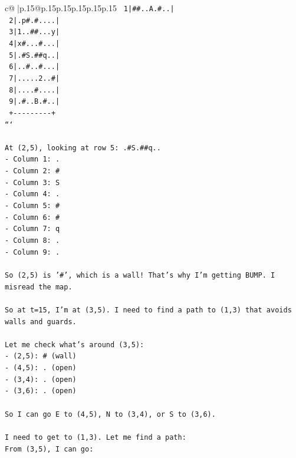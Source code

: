 \documentclass{article}
\begin{document}
{\begin{supertabular}{c@{$\;$}|p{.15\linewidth}@{}p{.15\linewidth}p{.15\linewidth}p{.15\linewidth}p{.15\linewidth}p{.15\linewidth}}
{{{\texttt{ 1|\#\#..A.\#..|} \\
\texttt{ 2|.p\#.\#....|} \\
\texttt{ 3|1..\#\#...y|} \\
\texttt{ 4|x\#...\#...|} \\
\texttt{ 5|.\#S.\#\#q..|} \\
\texttt{ 6|..\#..\#...|} \\
\texttt{ 7|.....2..\#|} \\
\texttt{ 8|....\#....|} \\
\texttt{ 9|.\#..B.\#..|} \\
\texttt{  +{-}{-}{-}{-}{-}{-}{-}{-}{-}+} \\
\texttt{```} \\
\\ 
\texttt{At (2,5), looking at row 5: .\#S.\#\#q..} \\
\texttt{{-} Column 1: .} \\
\texttt{{-} Column 2: \#} \\
\texttt{{-} Column 3: S} \\
\texttt{{-} Column 4: .} \\
\texttt{{-} Column 5: \#} \\
\texttt{{-} Column 6: \#} \\
\texttt{{-} Column 7: q} \\
\texttt{{-} Column 8: .} \\
\texttt{{-} Column 9: .} \\
\\ 
\texttt{So (2,5) is '\#', which is a wall! That's why I'm getting BUMP. I misread the map.} \\
\\ 
\texttt{So at t=15, I'm at (3,5). I need to find a path to (1,3) that avoids walls and guards.} \\
\\ 
\texttt{Let me check what's around (3,5):} \\
\texttt{{-} (2,5): \# (wall)} \\
\texttt{{-} (4,5): . (open)} \\
\texttt{{-} (3,4): . (open)} \\
\texttt{{-} (3,6): . (open)} \\
\\ 
\texttt{So I can go E to (4,5), N to (3,4), or S to (3,6).} \\
\\ 
\texttt{I need to get to (1,3). Let me find a path:} \\
\texttt{From (3,5), I can go:} \\
}}}
\end{supertabular}}
\end{document}
